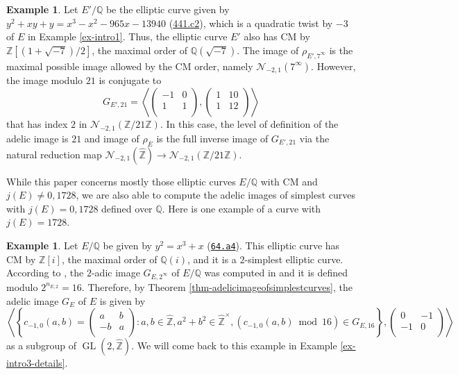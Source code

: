 \documentclass[11pt]{amsart}
\theoremstyle{definition}
\newtheorem{example}[defn]{Example}
\newcommand{\Q}{\mathbb{Q}}
\newcommand{\Z}{\mathbb{Z}}
\newcommand{\GL}{\operatorname{GL}}
\begin{document}
 \begin{example}\label{ex-intro2}
    Let $E'/\Q$ be the elliptic curve given by $y^2+xy+y=x^3-x^2-965x-13940$ 
 (\href{https://www.lmfdb.org/EllipticCurve/Q/441/c/2}{441.c2}), which is a quadratic twist by $-3$ of $E$ in Example \ref{ex-intro1}. Thus, the elliptic curve $E'$ also has CM by $\Z[(1+\sqrt{-7})/2]$, the maximal order of $\Q(\sqrt{-7})$. The image of $\rho_{E',7^\infty}$ is the maximal possible image allowed by the CM order, namely $\mathcal{N}_{-2,1}(7^\infty)$. However, the image modulo $21$ is conjugate to
    $$G_{E',21}=\left\langle \left(\begin{array}{cc} -1 & 0\\ 1 & 1 \\\end{array}\right), \left(\begin{array}{cc} 1 & 10\\ 1 & 12 \\\end{array}\right)\right\rangle$$
    that has index $2$ in $\mathcal{N}_{-2,1}(\Z/21\Z)$. In this case, the level of definition of the adelic image is $21$ and image of $\rho_E$ is the full inverse image of $G_{E',21}$ via the natural reduction map $\mathcal{N}_{-2,1}(\widehat{\Z})\to \mathcal{N}_{-2,1}(\Z/21\Z)$.
\end{example} 

While this paper concerns mostly those elliptic curves $E/\Q$ with CM and $j(E)\neq 0,1728$, we are also able to compute the adelic images of simplest curves with $j(E)=0,1728$ defined over $\Q$. Here is one example of a curve with $j(E)=1728$. 

 \begin{example} Let $E/\Q$ be given by $y^2=x^3+x$ (\href{https://www.lmfdb.org/EllipticCurve/Q/64/a/4}{\texttt{64.a4}}). This elliptic curve has CM by $\Z[i]$, the maximal order of $\Q(i)$, and it is a $2$-simplest elliptic curve. According to \cite[Table 4]{modelspaper}, the $2$-adic image $G_{E,2^\infty}$ of $E/\Q$ was computed in  \cite[Table 4]{modelspaper} and it is defined modulo $2^{n_{E,2}}=16$. Therefore, by Theorem \ref{thm-adelicimageofsimplestcurves}, the adelic image $G_E$ of $E$ is given by
   $$\left\langle \left\{ c_{-1,0}(a,b)=\left(\begin{array}{cc} a & b\\ -b & a \\\end{array}\right) : a,b \in \widehat{\Z}, a^2+b^2 \in \widehat{\Z}^\times, (c_{-1,0}(a,b) \bmod 16) \in G_{E,16}\right\}, \left(\begin{array}{cc} 0 & -1\\ -1 & 0 \\\end{array}\right)\right\rangle$$
   as a subgroup of $\GL(2,\widehat{\Z})$. We will come back to this example in Example \ref{ex-intro3-details}.
 \end{example}
\end{document}
